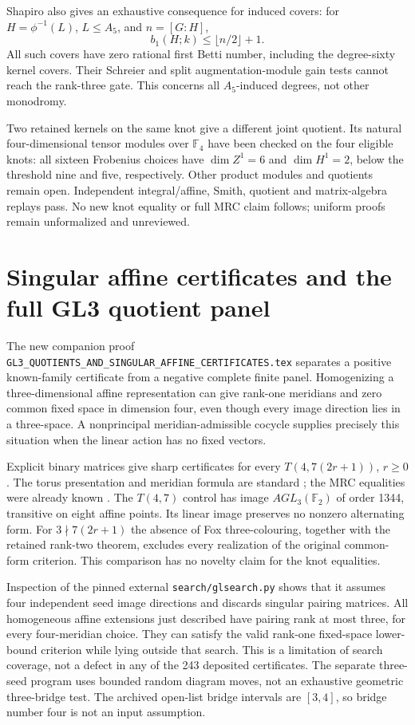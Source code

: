 \documentclass[11pt]{article}
\newcommand{\F}{\mathbb F}
\begin{document}
Shapiro also gives an exhaustive consequence for induced covers:
for $H=\phi^{-1}(L)$, $L\le A_5$, and $n=[G:H]$,
\[
 b_1(H;k)\le\lfloor n/2\rfloor+1.
\]
All such covers have zero rational first Betti number, including
the degree-sixty kernel covers. Their Schreier and split
augmentation-module gain tests cannot reach the rank-three gate.
This concerns all $A_5$-induced degrees, not other monodromy.

Two retained kernels on the same knot give a different joint
quotient. Its natural four-dimensional tensor modules over
$\F_4$ have been checked on the four eligible knots: all sixteen
Frobenius choices have $\dim Z^1=6$ and $\dim H^1=2$, below the
threshold nine and five, respectively. Other product modules and
quotients remain open. Independent integral/affine, Smith, quotient
and matrix-algebra replays pass. No new knot equality or full MRC
claim follows; uniform proofs remain unformalized and unreviewed.

\section{Singular affine certificates and the full GL3 quotient panel}

The new companion proof
\texttt{GL3\_QUOTIENTS\_AND\_SINGULAR\_AFFINE\_CERTIFICATES.tex}
separates a positive known-family certificate from a negative complete
finite panel. Homogenizing a three-dimensional affine representation
can give rank-one meridians and zero common fixed space in dimension
four, even though every image direction lies in a three-space. A
nonprincipal meridian-admissible cocycle supplies precisely this
situation when the linear action has no fixed vectors.

Explicit binary matrices give sharp certificates for every
$T(4,7(2r+1))$, $r\ge0$. The torus presentation and meridian formula
are standard \cite{cornwell}; the MRC equalities were already known
\cite{rz}. The $T(4,7)$ control has image $AGL_3(\F_2)$ of order
1344, transitive on eight affine points. Its linear image preserves
no nonzero alternating form. For $3\nmid7(2r+1)$ the absence of
Fox three-colouring, together with the retained rank-two theorem,
excludes every realization of the original common-form criterion.
This comparison has no novelty claim for the knot equalities.

Inspection of the pinned external \texttt{search/glsearch.py}
shows that it assumes four independent seed image directions and
discards singular pairing matrices. All homogeneous affine
extensions just described have pairing rank at most three, for
every four-meridian choice. They can satisfy the valid rank-one
fixed-space lower-bound criterion while lying outside that search.
This is a limitation of search coverage, not a defect in any of
the 243 deposited certificates. The separate three-seed program
uses bounded random diagram moves, not an exhaustive geometric
three-bridge test. The archived open-list bridge intervals are
$[3,4]$, so bridge number four is not an input assumption.
\end{document}
